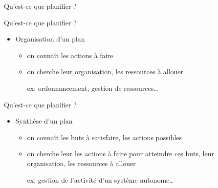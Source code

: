 \documentclass[compress]{beamer}
\begin{document}
\begin{frame}{Qu'est-ce que planifier ?}
\end{frame}

\begin{frame}{Qu'est-ce que planifier ?}
\begin{itemize}
\item {} Organisation d'un plan
	\begin{itemize}
	\item on connaît les actions à faire
	\item on cherche leur organisation, les ressources à allouer
	\item[ex:] ordonnancement, gestion de ressources\dots
	\end{itemize}
\end{itemize}
\begin{center}
\end{center}
\end{frame}

\begin{frame}{Qu'est-ce que planifier ?}
\begin{itemize}
\item {} Synthèse d'un plan
	\begin{itemize}
	\item on connaît les buts à satisfaire, les actions possibles
	\item on cherche leur les actions à faire pour atteindre ces buts, 
		leur organisation, les ressources à allouer
	\item[ex:] gestion de l'activité d'un système autonome\dots
	\end{itemize}
\end{itemize}
\end{frame}
\end{document}
